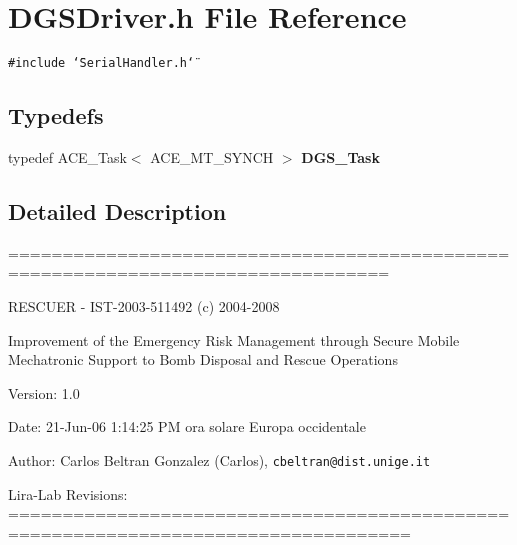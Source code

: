 \section{DGSDriver.h File Reference}
\label{DGSDriver_8h}
 


{\tt \#include \char`\"{}Serial\-Handler.h\char`\"{}}\par
\subsection*{Typedefs}
\begin{CompactItemize}
\item 
typedef ACE\_\-Task$<$ ACE\_\-MT\_\-SYNCH $>$ {\bf DGS\_\-Task}\label{DGSDriver_8h_a0}

\end{CompactItemize}


\subsection{Detailed Description}
=================================================================================

RESCUER - IST-2003-511492 (c) 2004-2008

Improvement of the Emergency Risk Management through Secure Mobile Mechatronic Support to Bomb Disposal and Rescue Operations

\begin{Desc}
\item[Version:]1.0 \end{Desc}
\begin{Desc}
\item[Date:]21-Jun-06 1:14:25 PM ora solare Europa occidentale \end{Desc}
\begin{Desc}
\item[Author:]Carlos Beltran Gonzalez (Carlos), {\tt cbeltran@dist.unige.it} 

Lira-Lab Revisions: ===================================================================================\end{Desc}
